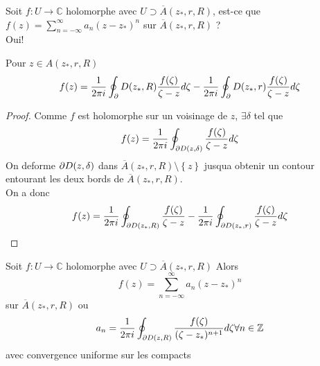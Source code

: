 \documentclass[../main.tex]{subfiles}
\begin{document}
Soit $f:U\to \mathbb{C}$ holomorphe avec $U \supset \overline{A}( z_*,r,R) $, est-ce que $f( z) = \sum_{n=- \infty }^{ \infty } a_n ( z-z_*) ^{n}$ sur $ \overline{A}( z_*,r ,R) $ ?\\
Oui!
\begin{thm}
	Pour $z\in A( z_*,r,R) $ 
	\begin{align*}
	f( z) = \frac{1}{2\pi i}\oint_\partial D( z_*,R) \frac{f( \zeta) }{\zeta-z} d\zeta -\frac{1}{2\pi i}\oint_\partial D( z_*,r) \frac{f( \zeta) }{\zeta-z} d\zeta
	\end{align*}
	
\end{thm}
\begin{proof}
Comme $f$ est holomorphe sur un voisinage de $z$, $\exists \delta$ tel que
\begin{align*}
f( z) = \frac{1}{2\pi i} \oint_{\partial D( z,\delta) }  \frac{f( \zeta) }{\zeta-z}d\zeta
\end{align*}
On deforme $\partial D( z,\delta)  $ dans $\overline{A}( z_*,r,R) \setminus \left\{ z \right\} $ jusqua obtenir un contour entourant les deux bords de $\overline{A}( z_*,r,R) $.\\
On a donc 
\begin{align*}
	f( z) = \frac{1}{2\pi i}\oint_{\partial D( z_*,R) } \frac{f( \zeta) }{\zeta-z} - \frac{1}{2\pi i} \oint_{\partial D( z_*,r) } \frac{f( \zeta) }{\zeta-z}d\zeta
\end{align*}
\end{proof}
\begin{thm}
	Soit $f:U\to \mathbb{C}$ holomorphe avec $U \supset \overline{A}( z_*,r,R) $ Alors
	\[ 
	f( z) = \sum_{n=- \infty }^{ \infty }a_n ( z-z_*) ^{n}
	\]
	sur $\overline{A}( z_*,r,R) $ ou 
	\[ 
	a_n = \frac{1}{2\pi i}\oint_{\partial D( z,R) }  \frac{f( \zeta) }{( \zeta-z_*) ^{n+1}} d\zeta \forall n \in \mathbb{Z}
	\]
	avec convergence uniforme sur les compacts
	
\end{thm}
\end{document}
